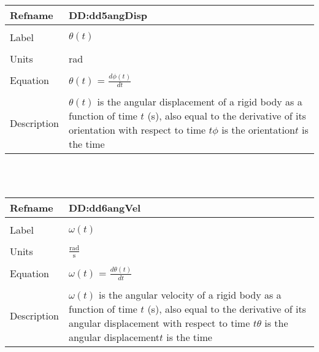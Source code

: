 \documentclass[12pt]{article}
\begin{document}
~\newline
\noindent \begin{minipage}{\textwidth}
\begin{tabular}{p{} p{}}
\toprule \textbf{Refname} & \textbf{DD:dd5angDisp}
\label{DD:dd5angDisp}
\\ \midrule \\
Label & $\theta{}(t)$
\\ \midrule \\
Units & rad
\\ \midrule \\
Equation & $\theta{}(t)$ = $\frac{d\phi{}(t)}{dt}$
\\ \midrule \\
Description & $\theta{}(t)$ is the angular displacement of a rigid body as a function of time $t$ (s), also equal to the derivative of its orientation with respect to time $t$\newline$\phi{}$ is the orientation\newline$t$ is the time
\\ \bottomrule \end{tabular}
\end{minipage}\\
~\newline
\noindent \begin{minipage}{\textwidth}
\begin{tabular}{p{} p{}}
\toprule \textbf{Refname} & \textbf{DD:dd6angVel}
\label{DD:dd6angVel}
\\ \midrule \\
Label & $\omega{}(t)$
\\ \midrule \\
Units & $\frac{\text{rad}}{\text{s}}$
\\ \midrule \\
Equation & $\omega{}(t)$ = $\frac{d\theta{}(t)}{dt}$
\\ \midrule \\
Description & $\omega{}(t)$ is the angular velocity of a rigid body as a function of time $t$ (s), also equal to the derivative of its angular displacement with respect to time $t$\newline$\theta{}$ is the angular displacement\newline$t$ is the time
\\ \bottomrule \end{tabular}
\end{minipage}\\
\end{document}
